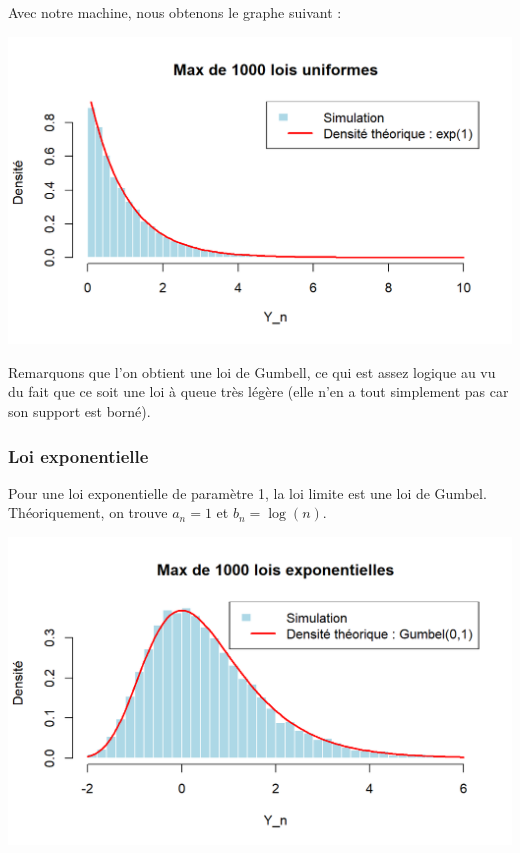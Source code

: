 \documentclass{article}
\begin{document}
\noindent Avec notre machine, nous obtenons le graphe suivant :

\begin{center}
	\includegraphics[scale=0.8]{./Codes_R/Max_Uniforme.png} 
\end{center}

\noindent Remarquons que l'on obtient une loi de Gumbell, ce qui est assez logique au vu du fait que ce soit une loi à queue très légère (elle n'en a tout simplement pas car son support est borné).

\subsubsection{Loi exponentielle}
\noindent Pour une loi exponentielle de paramètre 1, la loi limite est une loi de Gumbel. Théoriquement, on trouve $a_n = 1 $ et $b_n = \log(n) $.

\begin{center}
	\includegraphics[scale=0.8]{./Codes_R/Max_Expo.png} 
\end{center}
\end{document}
